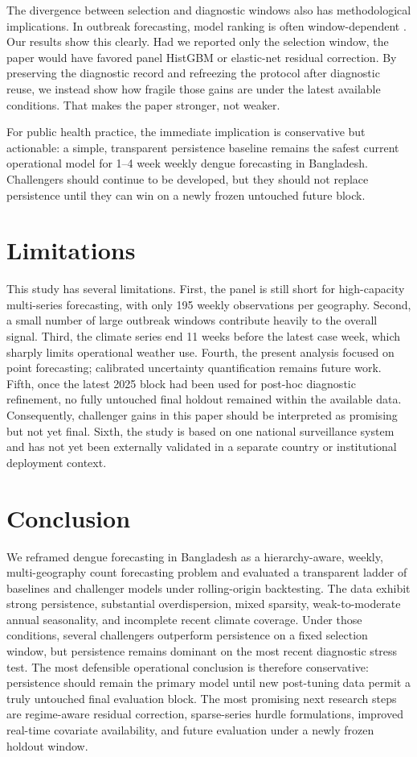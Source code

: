 \documentclass[11pt]{article}
\begin{document}
The divergence between selection and diagnostic windows also has methodological implications. In outbreak forecasting, model ranking is often window-dependent \citep{cramer2022evaluation}. Our results show this clearly. Had we reported only the selection window, the paper would have favored panel HistGBM or elastic-net residual correction. By preserving the diagnostic record and refreezing the protocol after diagnostic reuse, we instead show how fragile those gains are under the latest available conditions. That makes the paper stronger, not weaker.

For public health practice, the immediate implication is conservative but actionable: a simple, transparent persistence baseline remains the safest current operational model for 1--4 week weekly dengue forecasting in Bangladesh. Challengers should continue to be developed, but they should not replace persistence until they can win on a newly frozen untouched future block.

\section{Limitations}
This study has several limitations. First, the panel is still short for high-capacity multi-series forecasting, with only 195 weekly observations per geography. Second, a small number of large outbreak windows contribute heavily to the overall signal. Third, the climate series end 11 weeks before the latest case week, which sharply limits operational weather use. Fourth, the present analysis focused on point forecasting; calibrated uncertainty quantification remains future work. Fifth, once the latest 2025 block had been used for post-hoc diagnostic refinement, no fully untouched final holdout remained within the available data. Consequently, challenger gains in this paper should be interpreted as promising but not yet final. Sixth, the study is based on one national surveillance system and has not yet been externally validated in a separate country or institutional deployment context.

\section{Conclusion}
We reframed dengue forecasting in Bangladesh as a hierarchy-aware, weekly, multi-geography count forecasting problem and evaluated a transparent ladder of baselines and challenger models under rolling-origin backtesting. The data exhibit strong persistence, substantial overdispersion, mixed sparsity, weak-to-moderate annual seasonality, and incomplete recent climate coverage. Under those conditions, several challengers outperform persistence on a fixed selection window, but persistence remains dominant on the most recent diagnostic stress test. The most defensible operational conclusion is therefore conservative: persistence should remain the primary model until new post-tuning data permit a truly untouched final evaluation block. The most promising next research steps are regime-aware residual correction, sparse-series hurdle formulations, improved real-time covariate availability, and future evaluation under a newly frozen holdout window.
\end{document}
